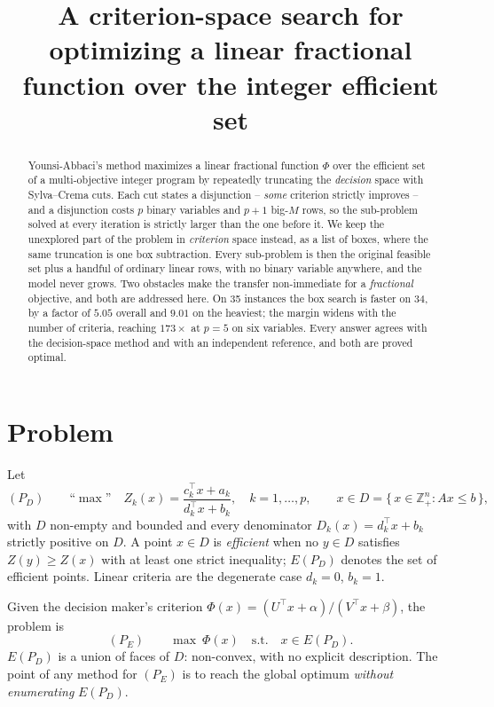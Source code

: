 \documentclass[11pt,a4paper]{article}
\title{A criterion-space search for optimizing a linear fractional
function over the integer efficient set}
\author{}
\date{}
\newcommand{\Z}{Z}
\newcommand{\Dset}{D}
\newcommand{\E}{E(P_{\Dset})}
\newcommand{\Zint}{\mathbb{Z}}
\begin{document}
\maketitle

\begin{abstract}
Younsi-Abbaci's method maximizes a linear fractional function $\Phi$ over the
efficient set of a multi-objective integer program by repeatedly truncating the
\emph{decision} space with Sylva--Crema cuts. Each cut states a disjunction --
\emph{some} criterion strictly improves -- and a disjunction costs $p$ binary
variables and $p+1$ big-$M$ rows, so the sub-problem solved at every iteration
is strictly larger than the one before it. We keep the unexplored part of the
problem in \emph{criterion} space instead, as a list of boxes, where the same
truncation is one box subtraction. Every sub-problem is then the original
feasible set plus a handful of ordinary linear rows, with no binary variable
anywhere, and the model never grows. Two obstacles make the transfer
non-immediate for a \emph{fractional} objective, and both are addressed here.
On 35 instances the box search is faster on 34, by a factor of $5.05$ overall
and $9.01$ on the heaviest; the margin widens with the number of criteria,
reaching $173\times$ at $p=5$ on six variables. Every answer agrees with the
decision-space method and with an independent reference, and both are proved
optimal.
\end{abstract}

\section{Problem}

Let
\begin{equation}
  (P_{\Dset}) \qquad \text{``}\max\text{''} \quad
  \Z_k(x) = \frac{c_k^{\top}x + a_k}{d_k^{\top}x + b_k},
  \quad k = 1,\dots,p,
  \qquad x \in \Dset = \{\, x \in \Zint^n_+ : Ax \leqslant b \,\},
\end{equation}
with $\Dset$ non-empty and bounded and every denominator
$D_k(x) = d_k^{\top}x + b_k$ strictly positive on $\Dset$. A point
$x \in \Dset$ is \emph{efficient} when no $y \in \Dset$ satisfies
$\Z(y) \geqslant \Z(x)$ with at least one strict inequality; $\E$ denotes the
set of efficient points. Linear criteria are the degenerate case $d_k = 0$,
$b_k = 1$.

Given the decision maker's criterion
$\Phi(x) = (U^{\top}x + \alpha)/(V^{\top}x + \beta)$, the problem is
\begin{equation}
  (P_E) \qquad \max \ \Phi(x) \quad \text{s.t.} \quad x \in \E .
\end{equation}
$\E$ is a union of faces of $\Dset$: non-convex, with no explicit description.
The point of any method for $(P_E)$ is to reach the global optimum
\emph{without enumerating} $\E$.
\end{document}
